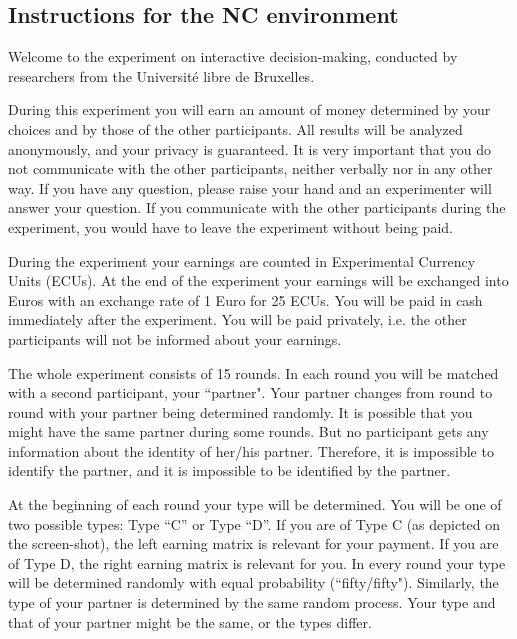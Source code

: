 \documentclass[12pt]{article}
\theoremstyle{break}
\begin{document}
\subsection{Instructions for the NC environment}

Welcome to the experiment on interactive decision-making, conducted by researchers from the Universit\'e libre de Bruxelles.

During this experiment you will earn an amount of money determined by your choices and by those of the other participants. All results will be analyzed anonymously, and your privacy is guaranteed. It is very important that you do not communicate with the other participants, neither verbally nor in any other way. If you have any question, please raise your hand and an experimenter will answer your question. If you communicate with the other participants during the experiment, you would have to leave the experiment without being paid. 

During the experiment your earnings are counted in Experimental Currency Units (ECUs). At the end of the experiment your earnings will be exchanged into Euros with an exchange rate of 1 Euro for 25 ECUs. You will be paid in cash immediately after the experiment. You will be paid privately, i.e. the other participants will not be informed about your earnings.

The whole experiment consists of 15 rounds. In each round you will be matched with a second participant, your ``partner". Your partner changes from round to round with your partner being determined randomly. It is possible that you might have the same partner during some rounds. But no participant gets any information about the identity of her/his partner. Therefore, it is impossible to identify the partner, and it is impossible to be identified by the partner.

At the beginning of each round your type will be determined. You will be one of two possible types: Type “C” or Type “D”. If you are of Type C (as depicted on the screen-shot), the left earning matrix is relevant for your payment. If you are of Type D, the right earning matrix is relevant for you. In every round your type will be determined randomly with equal probability (``fifty/fifty"). Similarly, the type of your partner is determined by the same random process. Your type and that of your partner might be the same, or the types differ.
 
\end{document}
